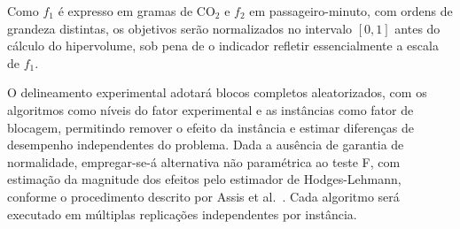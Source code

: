 \documentclass[12pt,a4paper]{article}
\theoremstyle{plain}
\begin{document}
Como $f_1$ é expresso em gramas de $\text{CO}_2$ e $f_2$ em passageiro-minuto, com ordens de grandeza distintas, os objetivos serão normalizados no intervalo $[0,1]$ antes do cálculo do hipervolume, sob pena de o indicador refletir essencialmente a escala de $f_1$.

O delineamento experimental adotará blocos completos aleatorizados, com os algoritmos como níveis do fator experimental e as instâncias como fator de blocagem, permitindo remover o efeito da instância e estimar diferenças de desempenho independentes do problema. Dada a ausência de garantia de normalidade, empregar-se-á alternativa não paramétrica ao teste F, com estimação da magnitude dos efeitos pelo estimador de Hodges-Lehmann, conforme o procedimento descrito por Assis et al.~\cite{assis2013}. Cada algoritmo será executado em múltiplas replicações independentes por instância.
\end{document}
